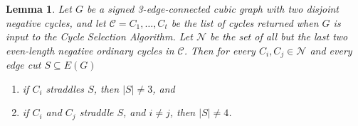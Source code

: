 \documentclass[12pt]{article}
\newtheorem{lemma}[theorem]{Lemma}
\begin{document}
\begin{lemma}\label{lem:negCycStraddle}
    Let $G$ be a signed 3-edge-connected cubic graph with two disjoint negative cycles, and let $\mathcal{C} = C_1, \dots, C_t$ be the list of cycles returned when $G$ is input to the Cycle Selection Algorithm. Let $\mathcal{N}$ be the set of all but the last two even-length negative ordinary cycles in $\mathcal{C}$. Then for every $C_i,C_j \in \mathcal{N}$ and every edge cut $S \subseteq E(G)$
\begin{enumerate}
    \item if $C_i$ straddles $S$, then $|S| \neq 3$, and
    \item if $C_i$ and $C_j$ straddle $S$, and $i \neq j$, then $|S| \neq 4$.
\end{enumerate}
\end{lemma}
\end{document}
